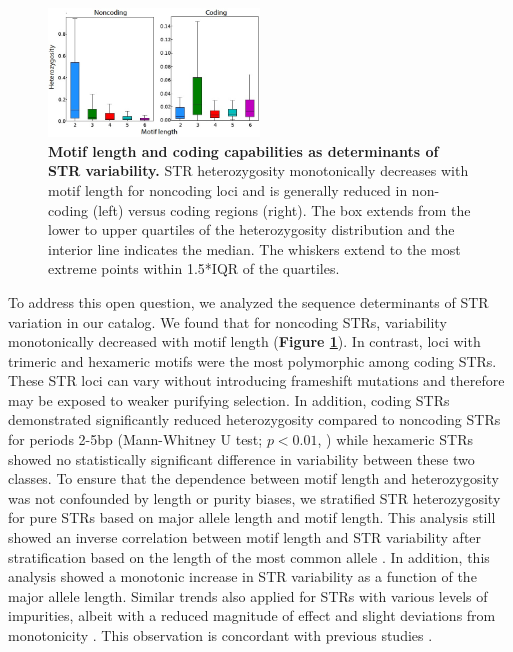 \begin{figure}[h!]
\centering
\label{fig:catfig4}
\includegraphics[width=0.5\textwidth]{Figures/Chapter3/Fig4.jpg}
\caption{\textbf{Motif length and coding capabilities as determinants of STR variability.} STR heterozygosity monotonically decreases with motif length for noncoding loci and is generally reduced in non-coding (left) versus coding regions (right). The box extends from the lower to upper quartiles of the heterozygosity distribution and the interior line indicates the median. The whiskers extend to the most extreme points within 1.5*IQR of the quartiles.}
\end{figure}

To address this open question, we analyzed the sequence determinants of STR variation in our catalog. We found that for noncoding STRs, variability monotonically decreased with motif length (\textbf{Figure \ref{fig:catfig4}}). In contrast, loci with trimeric and hexameric motifs were the most polymorphic among coding STRs. These STR loci can vary without introducing frameshift mutations and therefore may be exposed to weaker purifying selection. In addition, coding STRs demonstrated significantly reduced heterozygosity compared to noncoding STRs for periods 2-5bp (Mann-Whitney U test; $p < 0.01$, \cite{SuppWillemsGymrekHighnamEtAl2014}) while hexameric STRs showed no statistically significant difference in variability between these two classes. To ensure that the dependence between motif length and heterozygosity was not confounded by length or purity biases, we stratified STR heterozygosity for pure STRs based on major allele length and motif length. This analysis still showed an inverse correlation between motif length and STR variability after stratification based on the length of the most common allele \cite{SuppWillemsGymrekHighnamEtAl2014}. In addition, this analysis showed a monotonic increase in STR variability as a function of the major allele length. Similar trends also applied for STRs with various levels of impurities, albeit with a reduced magnitude of effect and slight deviations from monotonicity \cite{SuppWillemsGymrekHighnamEtAl2014}. This observation is concordant with previous studies \cite{Ellegren2000,LaiSun2003,WhittakerHarbordBoxallEtAl2003}.

